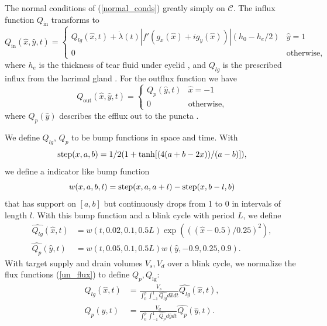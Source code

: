 The normal conditions of (\ref{normal_conds}) greatly simply on $\mathcal{C}$. The influx function $Q_{\text{in}}$ transforms to
\begin{equation}
Q_{\text{in}}(\hat{x},\hat{y},t) = \begin{cases}
Q_{lg}(\hat{x},t) + \dot{\lambda}(t)|f'(g_x(\hat{x})+i g_y(\hat{x}))|(h_0-h_e/2) & \hat{y}=1 \\
0 & \text{otherwise},
\end{cases}
\label{influx_fun}
\end{equation}
where $h_e$ is the thickness of tear fluid under eyelid \cite{heryudono2007single}, and $Q_{lg}$ is the prescribed influx from the lacrimal gland \cite{braun2015dynamics}. For the outflux function we have
\begin{equation}
Q_{\text{out}}(\hat{x},\hat{y},t) = \begin{cases}
Q_{p}(\hat{y},t) & \hat{x}=-1 \\
0 & \text{otherwise},
\end{cases}
\label{out_flux_fun}
\end{equation}
where $Q_{p}(\hat{y})$ describes the efflux out to the puncta \cite{braun2015dynamics}.

We define $Q_{lg}$, $Q_{p}$ to be bump functions in space and time. With
\begin{equation}
\operatorname{step}(x,a,b) = 1/2 (1 + \tanh[(4 (a + b - 2 x))/(a - b)]),
\end{equation}
we define a indicator like bump function
\begin{equation}
w(x,a,b,l) = \operatorname{step}(x,a,a+l)-\operatorname{step}(x,b-l,b)
\end{equation}
that has support on $[a,b]$ but continuously drops from 1 to 0 in intervals of length $l$. With this bump function and a blink cycle with period $L$, we define
\begin{eqnarray}
\hat{Q_{lg}}(\hat{x},t) &= w(t,0.02,0.1,0.5 L) \exp(((\hat{x}-0.5)/0.25)^2), \label{bumb_funs}  \\
\hat{Q_{p}}(\hat{y},t) &= w(t,0.05,0.1,0.5 L) w(\hat{y},-0.9,0.25,0.9). 
\end{eqnarray}
With target supply and drain volumes $V_s, V_d$ over a blink cycle, we normalize the flux functions (\ref{un_flux}) to define $Q_p,Q_{\lg}$:
\begin{eqnarray}
Q_{lg}(\hat{x},t) &= \frac{V_s}{\int_{0}^{p} \int_{-1}^1 \hat{Q_{lg}} d\hat{x} dt} \hat{Q_{lg}}(\hat{x},t), \\
Q_{p}(\hat{y},t) &= \frac{V_d}{\int_{0}^{p} \int_{-1}^1 \hat{Q_{p}} d\hat{y} dt} \hat{Q_{p}}(\hat{y},t).
\label{un_flux}
\end{eqnarray}
